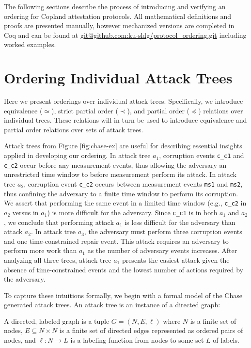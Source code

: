 \documentclass[runningheads]{llncs}
\theoremstyle{definition}
\begin{document}
The following sections describe the process of introducing and
verifying an ordering for Copland attestation protocols. All
mathematical definitions and proofs are presented manually, however
mechanized versions are completed in Coq and can be found at
\url{git@github.com:ku-sldg/protocol_ordering.git} including worked
examples. 

\section{Ordering Individual Attack Trees}

Here we present orderings over individual attack trees. Specifically,
we introduce equivalence ($\simeq$), strict partial order ($\prec$),
and partial order ($\preceq$) relations over individual trees. These
relations will in turn be used to introduce equivalence and partial
order relations over sets of attack trees.

Attack trees from Figure \ref{fig:chase-ex} are useful for describing
essential insights applied in developing our ordering. In attack tree
$a_1$, corruption events \texttt{c\_c1} and \texttt{c\_c2} occur
before any measurement events, thus allowing the adversary an
unrestricted time window to before measurement perform its attack. In
attack tree $a_2$, corruption event \texttt{c\_c2} occurs between
measurement events \texttt{ms1} and \texttt{ms2}, thus confining the
adversary to a finite time window to perform its corruption. We
assert that performing the same event in a limited time window (e.g.,
\texttt{c\_c2} in $a_2$ versus in $a_1$) is more difficult for the
adversary. Since \texttt{c\_c1} is in both $a_1$ and $a_2$, we
conclude that performing attack $a_1$ is less difficult for the
adversary than attack $a_2$.  In attack tree $a_3$, the adversary must
perform three corruption events and one time-constrained repair
event. This attack requires an adversary to perform more work than
$a_1$ as the number of adversary events increases. After analyzing all
three trees, attack tree $a_1$ presents the easiest attack given the
absence of time-constrained events and the lowest number of actions
required by the adversary.

To capture these intuitions formally, we begin with a formal model of
the Chase generated attack trees. An attack tree is an instance of a
directed graph:

\begin{definition}
    A directed, labeled graph is a tuple $G = (N, E, \ell)$ where $N$
    is a finite set of nodes, $E \subseteq N \times N$ is a finite set
    of directed edges represented as ordered pairs of nodes, and $\ell
    : N \rightarrow L$ is a labeling function from nodes to some set
    $L$ of labels. 
\end{definition} 
 
\end{document}
